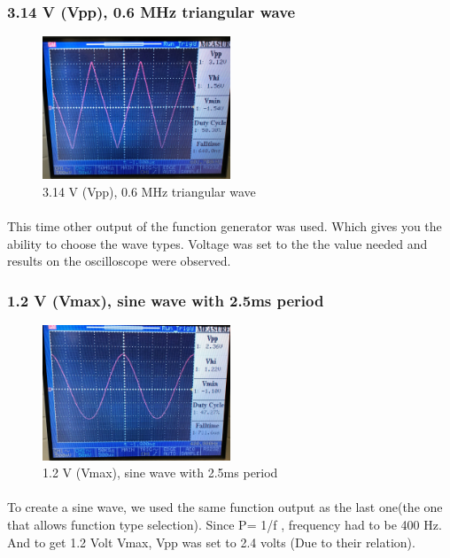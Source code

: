 \documentclass[pdftex,12pt,a4paper]{article}
\begin{document}
\newpage
\begin{flushleft}
\subsubsection{3.14 V (Vpp), 0.6 MHz triangular wave}
\begin{figure}[h]
    \centering
	\includegraphics[width=0.5\textwidth]{Photos/5_4_closeup.jpg}
	\caption{3.14 V (Vpp), 0.6 MHz triangular wave}
	\label{fig7}
\end{figure}
\paragraph{}
This time other output of the function generator was used. Which gives you the ability to choose the wave types. Voltage was set to the the value needed and results on the oscilloscope were observed.
\end{flushleft}



\begin{flushleft}
\subsubsection{1.2 V (Vmax), sine wave with 2.5ms period}
\begin{figure}[h]
    \centering
	\includegraphics[width=0.5\textwidth]{Photos/5_5_closeup.jpg}
	\caption{1.2 V (Vmax), sine wave with 2.5ms period}
	\label{fig8}
\end{figure}
\paragraph{}
To create a sine wave, we used the same function output as the last one(the one that allows function type selection). Since P= 1/f , frequency had to be 400 Hz. And to get 1.2 Volt Vmax, Vpp was set to 2.4 volts (Due to their relation).
\end{flushleft}
\end{document}
